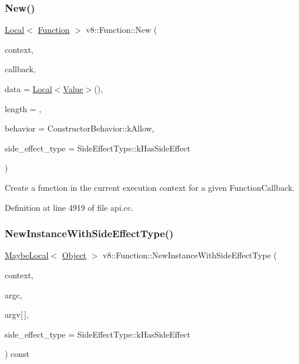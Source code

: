 \subsubsection{\texorpdfstring{New()}{New()}}
{\footnotesize\ttfamily \mbox{\hyperlink{classv8_1_1Local}{Local}}$<$ \mbox{\hyperlink{classv8_1_1Function}{Function}} $>$ v8\+::\+Function\+::\+New (\begin{DoxyParamCaption}\item[{\mbox{\hyperlink{classv8_1_1Local}{Local}}$<$ Context $>$}]{context,  }\item[{Function\+Callback}]{callback,  }\item[{\mbox{\hyperlink{classv8_1_1Local}{Local}}$<$ \mbox{\hyperlink{classv8_1_1Value}{Value}} $>$}]{data = {\ttfamily \mbox{\hyperlink{classv8_1_1Local}{Local}}$<$\mbox{\hyperlink{classv8_1_1Value}{Value}}$>$()},  }\item[{\mbox{\hyperlink{classint}{int}}}]{length = {},  }\item[{Constructor\+Behavior}]{behavior = {\ttfamily ConstructorBehavior\+:\+:kAllow},  }\item[{\mbox{\hyperlink{namespacev8_a29711319c2b9fc7716d65faee2f7b9cb}{Side\+Effect\+Type}}}]{side\+\_\+effect\+\_\+type = {\ttfamily SideEffectType\+:\+:kHasSideEffect} }\end{DoxyParamCaption})\hspace{0.3cm}{\ttfamily [static]}}

Create a function in the current execution context for a given Function\+Callback. 

Definition at line 4919 of file api.\+cc.

\mbox{\label{classv8_1_1Function_afe9f17d00c8da825b774f02b70d395a2}} 
\subsubsection{\texorpdfstring{New\+Instance\+With\+Side\+Effect\+Type()}{NewInstanceWithSideEffectType()}}
{\footnotesize\ttfamily \mbox{\hyperlink{classv8_1_1MaybeLocal}{Maybe\+Local}}$<$ \mbox{\hyperlink{classv8_1_1Object}{Object}} $>$ v8\+::\+Function\+::\+New\+Instance\+With\+Side\+Effect\+Type (\begin{DoxyParamCaption}\item[{\mbox{\hyperlink{classv8_1_1Local}{Local}}$<$ Context $>$}]{context,  }\item[{\mbox{\hyperlink{classint}{int}}}]{argc,  }\item[{\mbox{\hyperlink{classv8_1_1Local}{Local}}$<$ \mbox{\hyperlink{classv8_1_1Value}{Value}} $>$}]{argv\mbox{[}$\,$\mbox{]},  }\item[{\mbox{\hyperlink{namespacev8_a29711319c2b9fc7716d65faee2f7b9cb}{Side\+Effect\+Type}}}]{side\+\_\+effect\+\_\+type = {\ttfamily SideEffectType\+:\+:kHasSideEffect} }\end{DoxyParamCaption}) const}

